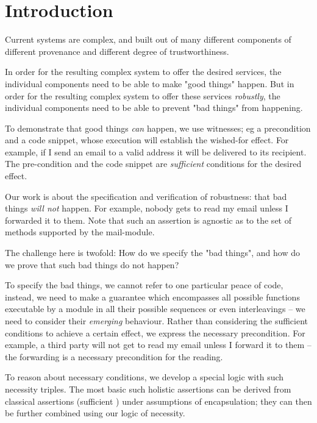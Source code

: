 \section{Introduction}

Current systems are complex, and  built out of many different components of different provenance and
different degree of trustworthiness.
  
  \newcommand{\prg}[1]{{\texttt{#1}}}
  
In order for the resulting  complex system to offer the
desired services, the individual components 
need to   be able to make "good things"   happen.
But in order for the resulting  complex system
 to offer these services \emph{robustly},  the individual components 
 need to be able to prevent "bad things" from happening. 

  To demonstrate that   good things \emph{can} happen, we use  witnesses;
eg  a precondition and a code snippet, whose execution will establish the
wished-for effect.  For example, if I send an email to a valid address it will
be delivered to its recipient. The pre-condition and the code snippet
are \emph{sufficient} conditions for the desired effect. 

Our work is about the specification and verification of robustness: that bad things \emph{will 
not} happen. For example, nobody gets to read my email unless I forwarded it to them.   
Note that such an assertion is agnostic as to the set of methods supported by the mail-module.

The challenge here is twofold: How do we specify the "bad things",
 and how do we prove that such bad things do not happen? 

To specify the bad things, we cannot
refer to one particular peace of code, %
 instead, we need to make a guarantee which encompasses all possible
 functions executable by a module in all their possible sequences or even interleavings --
 we need to consider their \emph{emerging} behaviour.
 Rather than considering the sufficient conditions to achieve a certain effect,
 we express the necessary precondition. For example,    a third party 
 will not get to read my email unless I forward it to them -- the forwarding
 is a necessary precondition for the reading.
 
 To reason about necessary conditions, we develop a special
 logic with such necessity triples. The most basic such holistic assertions 
 can be derived from classical assertions (sufficient )
 under assumptions of encapsulation;
 they can then be further combined using our logic of necessity.
 
